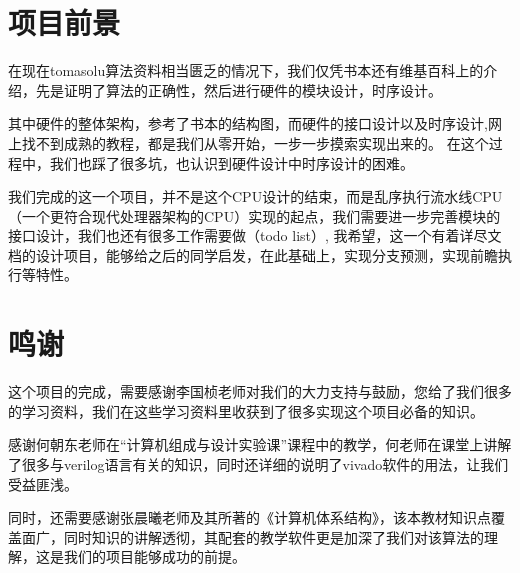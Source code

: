 \documentclass[twoside]{article}
\begin{document}
\section{项目前景}
在现在tomasolu算法资料相当匮乏的情况下，我们仅凭书本还有维基百科上的介绍，先是证明了算法的正确性，然后进行硬件的模块设计，时序设计。

其中硬件的整体架构，参考了书本的结构图，而硬件的接口设计以及时序设计,网上找不到成熟的教程，都是我们从零开始，一步一步摸索实现出来的。
在这个过程中，我们也踩了很多坑，也认识到硬件设计中时序设计的困难。

我们完成的这一个项目，并不是这个CPU设计的结束，而是乱序执行流水线CPU（一个更符合现代处理器架构的CPU）实现的起点，我们需要进一步完善模块的接口设计，我们也还有很多工作需要做（todo list）, 我希望，这一个有着详尽文档的设计项目，能够给之后的同学启发，在此基础上，实现分支预测，实现前瞻执行等特性。

\section{鸣谢}
这个项目的完成，需要感谢李国桢老师对我们的大力支持与鼓励，您给了我们很多的学习资料，我们在这些学习资料里收获到了很多实现这个项目必备的知识。

感谢何朝东老师在“计算机组成与设计实验课”课程中的教学，何老师在课堂上讲解了很多与verilog语言有关的知识，同时还详细的说明了vivado软件的用法，让我们受益匪浅。

同时，还需要感谢张晨曦老师及其所著的《计算机体系结构》，该本教材知识点覆盖面广，同时知识的讲解透彻，其配套的教学软件更是加深了我们对该算法的理解，这是我们的项目能够成功的前提。




\end{document}
